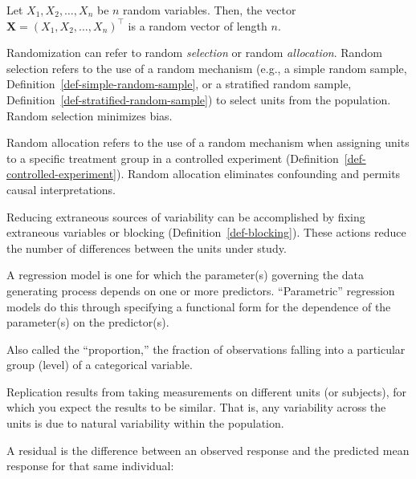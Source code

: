 \documentclass[
  letterpaper,
  DIV=11,
  numbers=noendperiod]{scrreprt}
\providecommand{\tightlist}{%
  \setlength{\itemsep}{0pt}\setlength{\parskip}{0pt}}\usepackage{longtable,booktabs,array}
\theoremstyle{definition}
\theoremstyle{definition}
\theoremstyle{plain}
\theoremstyle{remark}
\begin{document}
\begin{description}
\tightlist
\item[Random Vector (Definition~\ref{def-random-vector})]
Let \(X_1, X_2, \dots, X_n\) be \(n\) random variables. Then, the vector
\(\mathbf{X} = \left(X_1, X_2, \dots, X_n\right)^\top\) is a random
vector of length \(n\).
\item[Randomization (Definition~\ref{def-randomization})]
Randomization can refer to random \emph{selection} or random
\emph{allocation}. Random selection refers to the use of a random
mechanism (e.g., a simple random sample,
Definition~\ref{def-simple-random-sample}, or a stratified random
sample, Definition~\ref{def-stratified-random-sample}) to select units
from the population. Random selection minimizes bias.
\end{description}

Random allocation refers to the use of a random mechanism when assigning
units to a specific treatment group in a controlled experiment
(Definition~\ref{def-controlled-experiment}). Random allocation
eliminates confounding and permits causal interpretations.

\begin{description}
\tightlist
\item[Reduction of Noise (Definition~\ref{def-noise-reduction})]
Reducing extraneous sources of variability can be accomplished by fixing
extraneous variables or blocking (Definition~\ref{def-blocking}). These
actions reduce the number of differences between the units under study.
\item[Regression (Definition~\ref{def-regression})]
A regression model is one for which the parameter(s) governing the data
generating process depends on one or more predictors. ``Parametric''
regression models do this through specifying a functional form for the
dependence of the parameter(s) on the predictor(s).
\item[Relative Frequency (Definition~\ref{def-relative-frequency})]
Also called the ``proportion,'' the fraction of observations falling
into a particular group (level) of a categorical variable.
\item[Replication (Definition~\ref{def-replication})]
Replication results from taking measurements on different units (or
subjects), for which you expect the results to be similar. That is, any
variability across the units is due to natural variability within the
population.
\item[Residual (Definition~\ref{def-residual})]
A residual is the difference between an observed response and the
predicted mean response for that same individual:
\end{description}
\end{document}
